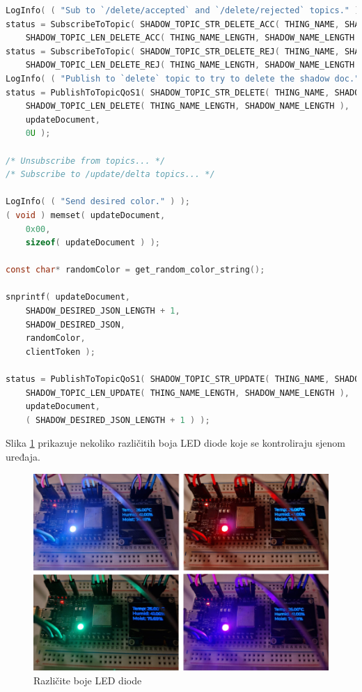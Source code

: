 \begin{lstlisting}[caption={Proces ažuriranja sjene uređaja}, language=c]
LogInfo( ( "Sub to `/delete/accepted` and `/delete/rejected` topics." ) );
status = SubscribeToTopic( SHADOW_TOPIC_STR_DELETE_ACC( THING_NAME, SHADOW_NAME ),
	SHADOW_TOPIC_LEN_DELETE_ACC( THING_NAME_LENGTH, SHADOW_NAME_LENGTH ) );
status = SubscribeToTopic( SHADOW_TOPIC_STR_DELETE_REJ( THING_NAME, SHADOW_NAME ),
	SHADOW_TOPIC_LEN_DELETE_REJ( THING_NAME_LENGTH, SHADOW_NAME_LENGTH ) );
LogInfo( ( "Publish to `delete` topic to try to delete the shadow doc." ) );
status = PublishToTopicQoS1( SHADOW_TOPIC_STR_DELETE( THING_NAME, SHADOW_NAME ), 
	SHADOW_TOPIC_LEN_DELETE( THING_NAME_LENGTH, SHADOW_NAME_LENGTH ),
	updateDocument,
	0U );
			
/* Unsubscribe from topics... */
/* Subscribe to /update/delta topics... */

LogInfo( ( "Send desired color." ) );
( void ) memset( updateDocument,
	0x00,
	sizeof( updateDocument ) );

const char* randomColor = get_random_color_string();

snprintf( updateDocument,
	SHADOW_DESIRED_JSON_LENGTH + 1,
	SHADOW_DESIRED_JSON,
	randomColor,
	clientToken );

status = PublishToTopicQoS1( SHADOW_TOPIC_STR_UPDATE( THING_NAME, SHADOW_NAME ),
	SHADOW_TOPIC_LEN_UPDATE( THING_NAME_LENGTH, SHADOW_NAME_LENGTH ),
	updateDocument,
	( SHADOW_DESIRED_JSON_LENGTH + 1 ) );
\end{lstlisting}

Slika \ref{fig:rgb_lights} prikazuje nekoliko različitih boja LED diode koje se kontroliraju sjenom uređaja. 

\begin{figure}[ht]
	\centering
	\includegraphics[scale=0.5]{imgs/rgb_lights}
	\caption{Različite boje LED diode}
	\label{fig:rgb_lights}
\end{figure}
